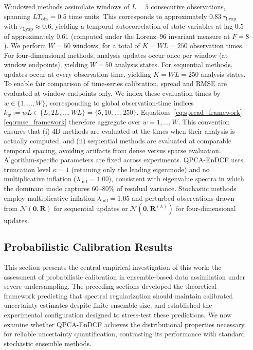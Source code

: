 \documentclass[11pt,a4paper]{article}
\begin{document}
Windowed methods assimilate windows of $L=5$ consecutive observations, spanning $LT_{\mathrm{obs}}=0.5$ time units. This corresponds to approximately $0.83\,\tau_{\mathrm{Lyap}}$ with $\tau_{\mathrm{Lyap}}\approx0.6$, yielding a temporal autocorrelation of state variables at lag $0.5$ of approximately $0.61$ (computed under the Lorenz--96 invariant measure at $F=8$). We perform $W=50$ windows, for a total of $K=WL=250$ observation times. For four-dimensional methods, analysis updates occur once per window (at window endpoints), yielding $W=50$ analysis states. For sequential methods, updates occur at every observation time, yielding $K=WL=250$ analysis states. To enable fair comparison of time-series calibration, spread and RMSE are evaluated at window endpoints only. We index these evaluation times by $w\in\{1,\ldots,W\}$, corresponding to global observation-time indices $k_w:=wL\in\{L,2L,\ldots,WL\}=\{5,10,\ldots,250\}$. Equations~\eqref{eq:spread_framework}--\eqref{eq:rmse_framework} therefore aggregate over $w=1,\ldots,W$. This convention ensures that (i) 4D methods are evaluated at the times when their analysis is actually computed, and (ii) sequential methods are evaluated at comparable temporal spacing, avoiding artifacts from dense versus sparse evaluation. Algorithm-specific parameters are fixed across experiments. QPCA-EnDCF uses truncation level $\kappa=1$ (retaining only the leading eigenmode) and no multiplicative inflation ($\lambda_{\mathrm{infl}}=1.00$), consistent with eigenvalue spectra in which the dominant mode captures $60$--$80\%$ of residual variance. Stochastic methods employ multiplicative inflation $\lambda_{\mathrm{infl}}=1.05$ and perturbed observations drawn from $\mathcal{N}(\mathbf{0},\mathbf{R})$ for sequential updates or $\mathcal{N}(\mathbf{0},\mathbf{R}^{(L)})$ for four-dimensional updates.



\subsection{Probabilistic Calibration Results}\label{subsec:calibration}

This section presents the central empirical investigation of this work: the assessment of probabilistic calibration in ensemble-based data assimilation under severe undersampling. The preceding sections developed the theoretical framework predicting that spectral regularization should maintain calibrated uncertainty estimates despite finite ensemble size, and established the experimental configuration designed to stress-test these predictions. We now examine whether QPCA-EnDCF achieves the distributional properties necessary for reliable uncertainty quantification, contrasting its performance with standard stochastic ensemble methods.
\end{document}

